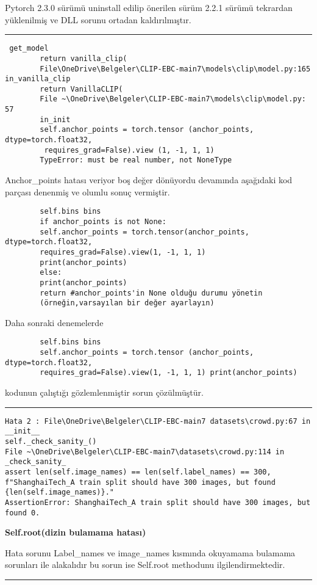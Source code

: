 \documentclass[10pt,a4paper]{report}
\begin{document}
	\begin{justify}
			Pytorch 2.3.0 sürümü uninstall edilip önerilen sürüm 2.2.1 sürümü tekrardan yüklenilmiş ve DLL sorunu ortadan kaldırılmıştır.
	\end{justify}

	

\rule{\linewidth}{0.65pt}
\begin{justify}
	\begin{verbatim} get_model
		return vanilla_clip(
		File\OneDrive\Belgeler\CLIP-EBC-main7\models\clip\model.py:165 in_vanilla_clip
		return VanillaCLIP(
		File ~\OneDrive\Belgeler\CLIP-EBC-main7\models\clip\model.py: 57
		in_init
		self.anchor_points = torch.tensor (anchor_points, dtype=torch.float32,
		 requires_grad=False).view (1, -1, 1, 1)
		TypeError: must be real number, not NoneType
	\end{verbatim}
	\hspace{-2em} %

	Anchor\_points hatası veriyor boş değer dönüyordu devamında aşağıdaki kod parçası denenmiş ve olumlu sonuç vermiştir.\newline
	
	
	\begin{verbatim}
		self.bins bins
		if anchor_points is not None:
		self.anchor_points = torch.tensor(anchor_points, dtype=torch.float32, 
		requires_grad=False).view(1, -1, 1, 1)
		print(anchor_points)
		else:
		print(anchor_points)
		return #anchor_points'in None olduğu durumu yönetin
		(örneğin,varsayılan bir değer ayarlayın)
	\end{verbatim}
	\hspace{-1em} Daha sonraki denemelerde 
	\begin{verbatim}
		self.bins bins
		self.anchor_points = torch.tensor (anchor_points, dtype=torch.float32, 
		requires_grad=False).view(1, -1, 1, 1) print(anchor_points)
	\end{verbatim}
	\hspace{-1em}	kodunun çalıştığı gözlemlenmiştir sorun çözülmüştür.\newline
	
\end{justify}


\rule{\linewidth}{0.65pt}
\begin{verbatim}
Hata 2 : File\OneDrive\Belgeler\CLIP-EBC-main7 datasets\crowd.py:67 in __init__
self._check_sanity_()
File ~\OneDrive\Belgeler\CLIP-EBC-main7\datasets\crowd.py:114 in _check_sanity_
assert len(self.image_names) == len(self.label_names) == 300, 
f"ShanghaiTech_A train split should have 300 images, but found {len(self.image_names)}."
AssertionError: ShanghaiTech_A train split should have 300 images, but found 0.
\end{verbatim}
\textbf{Self.root(dizin bulamama hatası)}
\begin{justify}
	Hata sorunu Label\_names ve image\_names kısmında okuyamama bulamama sorunları ile alakalıdır bu sorun ise Self.root methodunu ilgilendirmektedir.
\end{justify}
\rule{\linewidth}{0.65pt}
\end{document}
